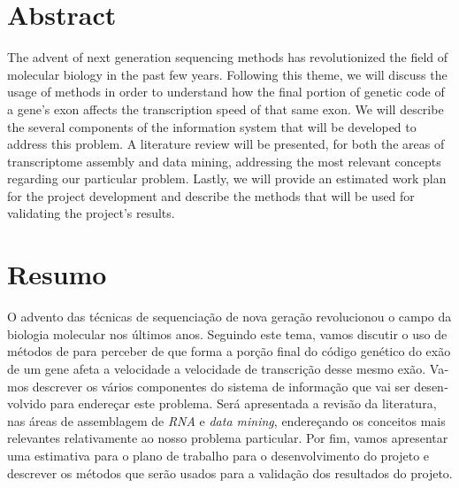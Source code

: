 \chapter*{Abstract}

The advent of next generation sequencing methods has revolutionized the field of
molecular biology in the past few years. Following this theme, we will discuss
the usage of \rnaseq{} methods in order to understand how the final portion of
genetic code of a gene's exon affects the transcription speed of that same exon.
We will describe the several components of the information system that will be
developed to address this problem. A literature review will be presented, for
both the areas of transcriptome assembly and data mining, addressing the most
relevant concepts regarding our particular problem. Lastly, we will provide an
estimated work plan for the project development and describe the methods that
will be used for validating the project's results.

\chapter*{Resumo}

\begin{otherlanguage}{portuguese}
O advento das técnicas de sequenciação de nova geração revolucionou o campo da
biologia molecular nos últimos anos. Seguindo este tema, vamos discutir o uso de
métodos de \textit{\rnaseq{}} para perceber de que forma a porção final do
código genético do exão de um gene afeta a velocidade a velocidade de
transcrição desse mesmo exão. Vamos descrever os vários componentes do sistema
de informação que vai ser desenvolvido para endereçar este problema. Será
apresentada a revisão da literatura, nas áreas de assemblagem de \textit{RNA} e
\textit{data mining}, endereçando os conceitos mais relevantes relativamente ao
nosso problema particular. Por fim, vamos apresentar uma estimativa para o plano
de trabalho para o desenvolvimento do projeto e descrever os métodos que serão
usados para a validação dos resultados do projeto.
\end{otherlanguage}
